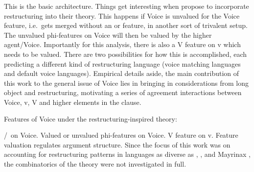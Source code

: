 \begin{exe}
\begin{xlist}
\begin{xlist}
\begin{xlist}
\begin{xlist}
\begin{xlist}
\begin{xlist}
\begin{exe}
\begin{xlist}
\begin{exe}
\begin{exe}
\begin{xlist}
\begin{exe}
\begin{exe}
\begin{xlist}
\begin{exe}
\begin{xlist}
\begin{exe}
\begin{xlist}
\begin{exe}
\begin{xlist}
\begin{exe}
\begin{xlist}
\begin{exe}
\begin{xlist}
\begin{exe}
\begin{xlist}
This is the basic architecture. Things get interesting when \cite{wurmbrandshimamura17} propose to incorporate restructuring into their theory. This happens if Voice is unvalued for the Voice feature, i.e.~gets merged without an  or  feature, in another sort of trivalent setup. The unvalued phi-features on Voice will then be valued by the higher agent/Voice. Importantly for this analysis, there is also a V feature on v which needs to be valued. There are two possibilities for how this is accomplished, each predicting a different kind of restructuring language (voice matching languages and default voice languages). Empirical details aside, the main contribution of this work to the general issue of Voice lies in bringing in considerations from long object  and restructuring, motivating a series of agreement interactions between Voice, v, V and higher elements in the clause.
 \begin{exe}
 \ex  Features of Voice under the restructuring-inspired theory: 
 \begin{xlist} 
 	\ex  {}/\zero~on Voice. 
 	\ex  Valued or unvalued phi-features on Voice. 
 	\ex  V feature on v. 
 \z
\z 
Feature valuation regulates argument structure. Since the focus of this work was on accounting for restructuring patterns in languages as diverse as , ,  and Mayrinax , the combinatorics of the theory were not investigated in full.


\end{xlist}
\end{exe}
\end{xlist}
\end{exe}
\end{xlist}
\end{exe}
\end{xlist}
\end{exe}
\end{xlist}
\end{exe}
\end{xlist}
\end{exe}
\end{xlist}
\end{exe}
\end{xlist}
\end{exe}
\end{exe}
\end{xlist}
\end{exe}
\end{exe}
\end{xlist}
\end{exe}
\end{xlist}
\end{xlist}
\end{xlist}
\end{xlist}
\end{xlist}
\end{xlist}
\end{exe}
